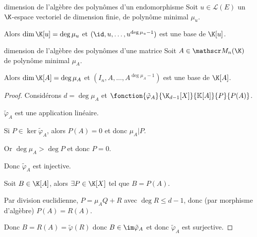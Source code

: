 \begin{theorement}{dimension de l'algèbre des polynômes d'un endomorphisme}{}
    Soit $u \in \mathscr L(E)$ un $\K$-espace vectoriel de dimension finie, 
    de polynôme minimal $\mu_u$. 

    Alors $\dim \K[u] = \deg \mu_u$ et $(\id, u, \ldots, u^{\deg \mu_u - 1})$ est une base de $\K[u]$.
\end{theorement}

\begin{theorement}{dimension de l'algèbre des polynômes d'une matrice}{}
    Soit $A \in \mathscr M_n(\K)$ de polynôme minimal $\mu_A$.

    Alors $\dim \K[A] = \deg \mu_A$ et $(I_n, A, \ldots, A^{\deg \mu_A - 1})$ est une base de $\K[A]$.
\end{theorement}

\begin{proof}
    Considérons $d = \deg \mu_A$ et $\fonction{\tilde \varphi_A}{\K_{d - 1}[X]}{\mathbb K[A]}{P}{P(A)}$.

    $\tilde \varphi_A$ est une application linéaire. 

    Si $P \in \ker \tilde \varphi_A$, alors $P(A) = 0$ et donc $\mu_A | P$.

    Or $\deg \mu_A > \deg P$ et donc $P = 0$.

    Donc $\tilde \varphi_A$ est injective.

    \avspace Soit $B \in \K [A]$, alors $\exists P \in \K[X]$ tel que $B = P(A)$.

    Par division euclidienne, $P = \mu_A Q + R$ avec $\deg R \leqslant d - 1$, donc 
    (par morphisme d'algèbre) $P(A) = R(A)$.

    Donc $B = R(A) = \tilde \varphi(R)$ donc $B \in \im \tilde \varphi_A$ et donc 
    $\tilde \varphi_A$ est surjective.
\end{proof}

